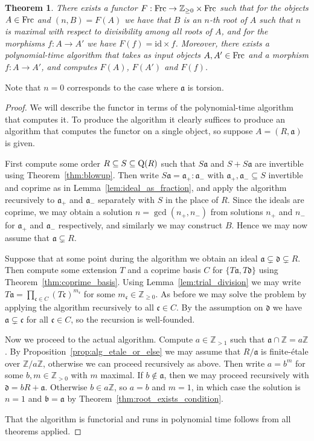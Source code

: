 \documentclass{amsart}
\theoremstyle{plain}
\newtheorem{theorem}{Theorem}[section]
\theoremstyle{definition}
\newcommand{\id}{\mathrm{id}}
\newcommand{\Z}{\ensuremath{\mathbb{Z}}}
\begin{document}
\begin{theorem}\label{thm:max_ideal_root}
There exists a functor $F:\textup{Frc}\to\Z_{\geq0}\times \textup{Frc}$ such that for the objects $A\in\textup{Frc}$ and $(n,B)=F(A)$ we have that $B$ is an $n$-th root of $A$ such that $n$ is maximal with respect to divisibility among all roots of $A$, and for the morphisms $f:A\to A'$ we have $F(f)=\id \times f$. 
Moreover, there exists a polynomial-time algorithm that takes as input objects $A,A'\in\textup{Frc}$ and a morphism $f:A\to A'$, and computes $F(A)$, $F(A')$ and $F(f)$.
\end{theorem}
Note that \(n=0\) corresponds to the case where \(\mathfrak{a}\) is torsion.
\begin{proof} 
We will describe the functor in terms of the polynomial-time algorithm that computes it.
To produce the algorithm it clearly suffices to produce an algorithm that computes the functor on a single object, so suppose $A=(R,\mathfrak{a})$ is given. 

First compute some order \(R\subseteq S\subseteq \textup{Q}(R)\) such that \(S\mathfrak{a}\) and \(S+S\mathfrak{a}\) are invertible using Theorem~\ref{thm:blowup}.
Then write \(S\mathfrak{a}=\mathfrak{a}_+:\mathfrak{a}_-\) with \(\mathfrak{a}_+,\mathfrak{a}_-\subseteq S\) invertible and coprime as in Lemma~\ref{lem:ideal_as_fraction}, and apply the algorithm recursively to \(\mathfrak{a}_+\) and \(\mathfrak{a}_-\) separately with \(S\) in the place of \(R\).
Since the ideals are coprime, we may obtain a solution \(n=\gcd(n_+,n_-)\) from solutions \(n_+\) and \(n_-\) for \(\mathfrak{a}_+\) and \(\mathfrak{a}_-\) respectively, and similarly we may construct \(B\).
Hence we may now assume that \(\mathfrak{a}\subsetneq R\).

Suppose that at some point during the algorithm we obtain an ideal \(\mathfrak{a}\subsetneq\mathfrak{d}\subsetneq R\).
Then compute some extension \(T\) and a coprime basis \(C\) for \(\{T\mathfrak{a},T\mathfrak{d}\}\) using Theorem~\ref{thm:coprime_basis}.
Using Lemma~\ref{lem:trial_division} we may write \(T\mathfrak{a}=\prod_{\mathfrak{c}\in C} (T\mathfrak{c})^{m_{\mathfrak{c}}}\) for some \(m_\mathfrak{c}\in\Z_{\geq 0}\).
As before we may solve the problem by applying the algorithm recursively to all \(\mathfrak{c}\in C\).
By the assumption on \(\mathfrak{d}\) we have \(\mathfrak{a}\subsetneq \mathfrak{c}\) for all \(\mathfrak{c}\in C\), so the recursion is well-founded.

Now we proceed to the actual algorithm.
Compute \(a\in\Z_{>1}\) such that \(\mathfrak{a}\cap\Z=a\Z\).
By Proposition~\ref{prop:alg_etale_or_else} we may assume that \(R/\mathfrak{a}\) is finite-\'etale over \(\Z/a\Z\), otherwise we can proceed recursively as above.
Then write \(a=b^m\) for some \(b,m\in\Z_{>0}\) with \(m\) maximal.
If \(b\not\in\mathfrak{a}\), then we may proceed recursively with \(\mathfrak{d}=bR+\mathfrak{a}\). 
Otherwise \(b\in a\Z\), so \(a=b\) and \(m=1\), in which case the solution is \(n=1\) and \(\mathfrak{b}=\mathfrak{a}\) by Theorem~\ref{thm:root_exists_condition}.

That the algorithm is functorial and runs in polynomial time follows from all theorems applied.
\end{proof}
\end{document}
